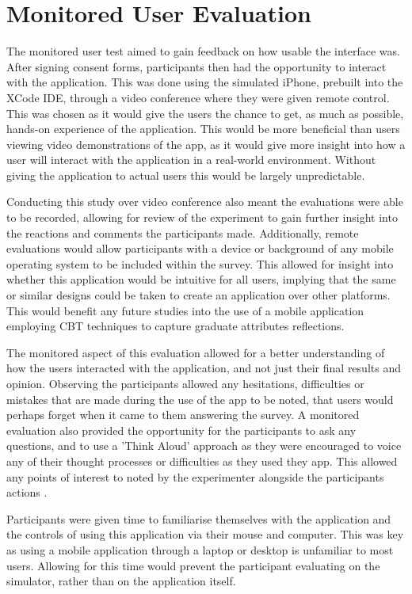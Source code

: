 \documentclass{l4proj}
\begin{document}
\section{Monitored User Evaluation}

The monitored user test aimed to gain feedback on how usable the interface was. After signing consent forms, participants then had the opportunity to interact with the application. This was done using the simulated iPhone, prebuilt into the XCode IDE, through a video conference where they were given remote control. This was chosen as it would give the users the chance to get, as much as possible, hands-on experience of the application. This would be more beneficial than users viewing video demonstrations of the app, as it would give more insight into how a user will interact with the application in a real-world environment. Without giving the application to actual users this would be largely unpredictable. 
 
Conducting this study over video conference also meant the evaluations were able to be recorded, allowing for review of the experiment to gain further insight into the reactions and comments the participants made. Additionally, remote evaluations would allow participants with a device or background of any mobile operating system to be included within the survey. This allowed for insight into whether this application would be intuitive for all users, implying that the same or similar designs could be taken to create an application over other platforms. This would benefit any future studies into the use of a mobile application employing CBT techniques to capture graduate attributes reflections. 

The monitored aspect of this evaluation allowed for a better understanding of how the users interacted with the application, and not just their final results and opinion. Observing the participants allowed any hesitations, difficulties or mistakes that are made during the use of the app to be noted, that users would perhaps forget when it came to them answering the survey. A monitored evaluation also provided the opportunity for the participants to ask any questions, and to use a 'Think Aloud' approach as they were encouraged to voice any of their thought processes or difficulties as they used they app. This allowed any points of interest to noted by the experimenter alongside the participants actions \citep{lewis_task-centered_1994}.
 
Participants were given time to familiarise themselves with the application and the controls of using this application via their mouse and computer. This was key as using a mobile application through a laptop or desktop is unfamiliar to most users. Allowing for this time would prevent the participant evaluating on the simulator, rather than on the application itself. 
 
\end{document}
